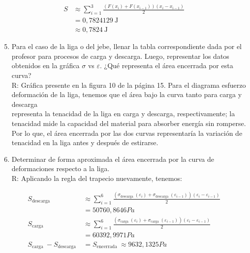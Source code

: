 $$
\begin{aligned}
S & \approx \sum_{i=1}^{3} \frac{\left(F\left(x_{i}\right)+F\left(x_{i-1}\right)\right)\left(x_{i}-x_{i-1}\right)}{2} \\
& =0,7824129 \mathrm{~J} \\
& \approx 0,7824 \mathrm{~J}
\end{aligned}
$$

\begin{enumerate}
  \setcounter{enumi}{4}
  \item Para el caso de la liga o del jebe, llenar la tabla correspondiente dada por el profesor para procesos de carga y descarga. Luego, representar los datos obtenidos en la gráfica $\sigma$ vs $\varepsilon$. ¿Qué representa el área encerrada por esta curva?\\
R: Gráfica presente en la figura 10 de la página 15. Para el diagrama esfuerzo deformación de la liga, tenemos que el área bajo la curva tanto para carga y descarga\\
representa la tenacidad de la liga en carga y descarga, respectivamente; la tenacidad mide la capacidad del material para absorber energía sin romperse. Por lo que, el área encerrada por las dos curvas representaría la variación de tenacidad en la liga antes y después de estirarse.
  \item Determinar de forma aproximada el área encerrada por la curva de deformaciones respecto a la liga.\\
R: Aplicando la regla del trapecio nuevamente, tenemos:
\end{enumerate}

$$
\begin{aligned}
S_{\text {descarga }} & \approx \sum_{i=1}^{6} \frac{\left(\sigma_{\text {descarga }}\left(\varepsilon_{i}\right)+\sigma_{\text {descarga }}\left(\varepsilon_{i-1}\right)\right)\left(\varepsilon_{i}-\varepsilon_{i-1}\right)}{2} \\
& =50760,8646 P a \\
S_{\text {carga }} & \approx \sum_{i=1}^{6} \frac{\left(\sigma_{\text {carga }}\left(\varepsilon_{i}\right)+\sigma_{\text {carga }}\left(\varepsilon_{i-1}\right)\right)\left(\varepsilon_{i}-\varepsilon_{i-1}\right)}{2} \\
& =60392,9971 P a \\
S_{\text {carga }}-S_{\text {descarga }} & =S_{\text {encerrada }} \approx 9632,1325 P a
\end{aligned}
$$

